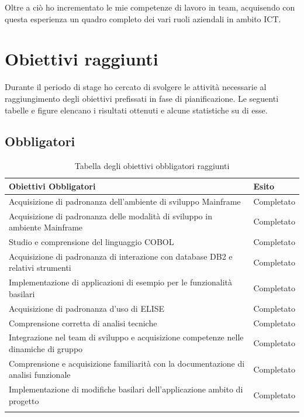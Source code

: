 Oltre a ciò ho incrementato le mie competenze di lavoro in team, acquisendo con questa esperienza un quadro completo dei vari ruoli aziendali in ambito ICT\glossario.


\section{Obiettivi raggiunti}

Durante il periodo di stage ho cercato di svolgere le attività necessarie al raggiungimento degli obiettivi prefissati in fase di pianificazione. Le seguenti tabelle e figure elencano i risultati ottenuti e alcune statistiche su di esse.

\subsection{Obbligatori}

		\begin{center}
		  \bgroup
		  \def\arraystretch{1.4}
		   \begin{longtable}{ | p{9cm} | p{2cm} | }  \hline
			 
			 \cellcolor[gray]{0.9} \textbf{Obiettivi Obbligatori} & \cellcolor[gray]{0.9} \textbf{Esito} \\ \hline
						 
			 Acquisizione di padronanza dell'ambiente di sviluppo Mainframe & Completato \\ \hline
			 Acquisizione di padronanza delle modalità di sviluppo in ambiente Mainframe & Completato \\ \hline
			 Studio e comprensione del linguaggio COBOL & Completato \\ \hline
			 Acquisizione di padronanza di interazione con database DB2 e relativi strumenti & Completato \\ \hline
			 Implementazione di applicazioni di esempio per le funzionalità basilari & Completato \\ \hline
			 Acquisizione di padronanza d'uso di ELISE & Completato \\ \hline
			 Comprensione corretta di analisi tecniche & Completato \\ \hline
			 Integrazione nel team di sviluppo e acquisizione competenze nelle dinamiche di gruppo & Completato \\ \hline
			 Comprensione e acquisizione familiarità con la documentazione di analisi funzionale & Completato \\ \hline
			 Implementazione di modifiche basilari dell'applicazione ambito di progetto & Completato \\ \hline
			
			\caption{Tabella degli obiettivi obbligatori raggiunti}
			
		    \end{longtable}
		  \egroup
		\end{center}


